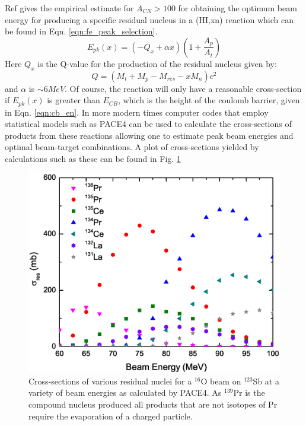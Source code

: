 Ref \cite{nucSpecAndReacPartC} gives the empirical estimate for $A_{CN}>100$ for obtaining the optimum beam energy for producing a specific residual nucleus in a (HI,xn) reaction which can be found in Eqn. \ref{eqn:fe_peak_selection}.
\begin{equation}
\label{eqn:fe_peak_selection}
E_{pk}(x)=(-Q_{x} + \alpha{}x)(1+\frac{A_p}{A_t})
\end{equation}
Here $Q_x$ is the Q-value for the production of the residual nucleus given by:
\begin{equation}
\label{eqn:res_qvalue}
Q = (M_t+M_p-M_{res}-x M_n)c^2
\end{equation}
and $\alpha$ is $\sim6MeV$. Of course, the reaction will only have a reasonable cross-section if $E_{pk}(x)$ is greater than $E_{CB}$, which is the height of the coulomb barrier, given in Eqn. \ref{eqn:cb_en}. In more modern times computer codes that employ statistical models such as PACE4\cite{PACE4,PACE4_2} can be used to calculate the cross-sections of products from these reactions allowing one to estimate peak beam energies and optimal beam-target combinations. A plot of cross-sections yielded by calculations such as these can be found in Fig. \ref{fig:chp3-pace4-calc}

\begin{figure}[h!]
	\centerline{\includegraphics[width=\textwidth]{./img/c3/135Pr_calc_plot.eps}}
	\caption{Cross-sections of various residual nuclei for a $^{16}$O beam on $^{123}$Sb at a variety of beam energies as calculated by PACE4. As $^{139}$Pr is the compound nucleus produced all products that are not isotopes of Pr require the evaporation of a charged particle.}
	\label{fig:chp3-pace4-calc}
\end{figure}

